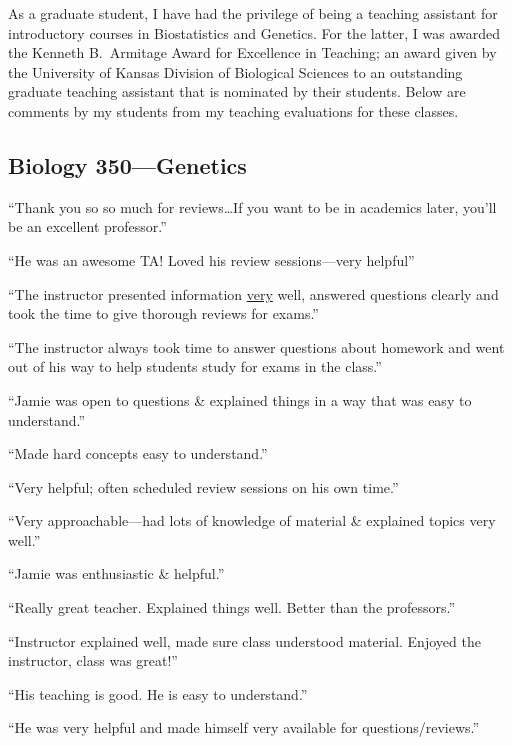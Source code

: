 As a graduate student, I have had the privilege of being a teaching assistant for
introductory courses in Biostatistics and Genetics.
For the latter, I was awarded the Kenneth B.\ Armitage Award for Excellence in
Teaching; an award given by the University of Kansas Division of Biological
Sciences to an outstanding graduate teaching assistant that is nominated by
their students.
Below are comments by my students from my teaching evaluations for these
classes.

\begin{multicols}{2}
\subsection*{Biology 350---Genetics}
\begin{myItemize}
\sffamily
\item ``Thank you so so much for reviews\ldots If you want to be in academics later, you'll be an excellent professor.''
\item ``He was an awesome TA! Loved his review sessions---very helpful''
\item ``The instructor presented information \underline{very} well, answered questions clearly and took the time to give thorough reviews for exams.''
\item ``The instructor always took time to answer questions about homework and went out of his way to help students study for exams in the class.''
\item ``Jamie was open to questions \& explained things in a way that was easy to understand.''
\item ``Made hard concepts easy to understand.''
\item ``Very helpful; often scheduled review sessions on his own time.''
\item ``Very approachable---had lots of knowledge of material \& explained topics very well.''
\item ``Jamie was enthusiastic \& helpful.''
\item ``Really great teacher. Explained things well. Better than the professors.''
\item ``Instructor explained well, made sure class understood material. Enjoyed the instructor, class was great!''
\item ``His teaching is good. He is easy to understand.''
\item ``He was very helpful and made himself very available for questions/reviews.''


\end{myItemize}
\end{multicols}
